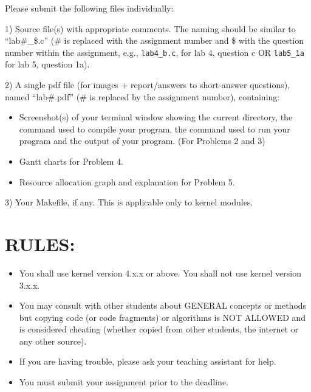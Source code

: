 \documentclass{article}
\begin{document}
Please submit the following files individually:

1) Source file(s) with appropriate comments. The naming should be similar to “lab\#\_\$.c” (\# is replaced with the assignment number and \$ with the question number within the assignment, e.g., \texttt{lab4\_b.c}, for lab 4, question c OR \texttt{lab5\_1a} for lab 5, question 1a).

2) A single pdf file (for images + report/answers to short-answer questions), named “lab\#.pdf” (\# is replaced by the assignment number), containing:
\begin{itemize}
    \item Screenshot(s) of your terminal window showing the current directory, the command used to compile your program, the command used to run your program and the output of your program.  (For Problems 2 and 3)
    \item Gantt charts for Problem 4.
    \item Resource allocation graph and explanation for Problem 5.
\end{itemize}
3) Your Makefile, if any. This is applicable only to kernel modules.


\section*{RULES:}

\begin{itemize}
    \item You shall use kernel version 4.x.x or above. You shall not use kernel version 3.x.x.
    \item You may consult with other students about GENERAL concepts or methods but copying code (or code fragments) or algorithms is NOT ALLOWED and is considered cheating (whether copied from other students, the internet or any other source).
    \item If you are having trouble, please ask your teaching assistant for help.
    \item You must submit your assignment prior to the deadline.
\end{itemize}
\end{document}
